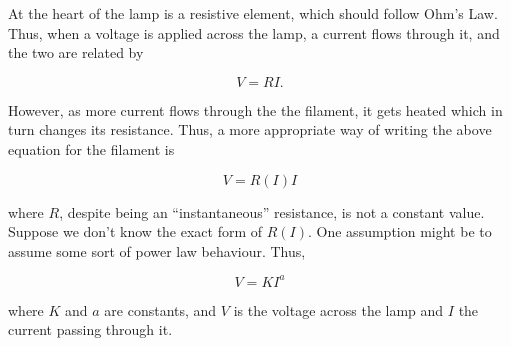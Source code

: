 \begin{refsection}
At the heart of the lamp is a resistive element, which should follow Ohm's Law. Thus, when a voltage is applied across the lamp, a current flows through it, and the two are related by 

\begin{equation}
    V = R I.
    \label{ohm}
\end{equation}

However, as more current flows through the the filament, it gets heated which in turn changes its resistance. Thus, a more appropriate way of writing the above equation for the filament is 

\begin{equation}
    V = R(I) I
\end{equation}

where $R$, despite being an ``instantaneous'' resistance, is not a constant value. Suppose we don't know the exact form of $R(I)$. One assumption might be to assume some sort of power law behaviour. Thus,

\begin{equation}
    V = K I^a
    \label{isl-Vpowerlaw}
\end{equation}

where $K$ and $a$ are constants, and $V$ is the voltage across the lamp and $I$ the current passing through it.







\end{refsection}
